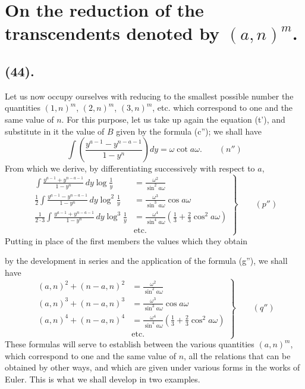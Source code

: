 \documentclass{article}
\begin{document}
\section*{On the reduction of the transcendents denoted by $(a,n)^{m}$.}

\subsection*{(44).}

Let us now occupy ourselves with reducing to the smallest possible number the quantities $(1,n)^{m}$, $(2,n)^{m}$, $(3,n)^{m}$, etc. which correspond to one and the same value of $n$. For this purpose, let us take up again the equation (t'), and substitute in it the value of $B$ given by the formula (c''); we shall have
\[ \int\left(\frac{y^{a-1}-y^{n-a-1}}{1-y^{n}}\right)dy=\omega\cot a\omega.\qquad(n'') \]
From which we derive, by differentiating successively with respect to $a$,
\[ \left.\begin{aligned} \int\frac{y^{a-1}+y^{n-a-1}}{1-y^{n}}\,dy\log\frac{1}{y}&=\frac{\omega^{2}}{\sin^{2}a\omega}\\ \frac{1}{2}\int\frac{y^{a-1}-y^{n-a-1}}{1-y^{n}}\,dy\log^{2}\frac{1}{y}&=\frac{\omega^{3}}{\sin^{3}a\omega}\cos a\omega\\ \frac{1}{2\cdot 3}\int\frac{y^{a-1}+y^{n-a-1}}{1-y^{n}}\,dy\log^{3}\frac{1}{y}&=\frac{\omega^{4}}{\sin^{4}a\omega}\left(\frac{1}{3}+\frac{2}{3}\cos^{2}a\omega\right)\\ &\text{etc.} \end{aligned}\right\}\qquad(p'') \]
Putting in place of the first members the values which they obtain

by the development in series and the application of the formula (g''), we shall have
\[ \left.\begin{aligned} (a,n)^{2}+(n-a,n)^{2}&=\frac{\omega^{2}}{\sin^{2}a\omega}\\ (a,n)^{3}+(n-a,n)^{3}&=\frac{\omega^{3}}{\sin^{3}a\omega}\cos a\omega\\ (a,n)^{4}+(n-a,n)^{4}&=\frac{\omega^{4}}{\sin^{4}a\omega}\left(\frac{1}{3}+\frac{2}{3}\cos^{2}a\omega\right)\\ &\text{etc.} \end{aligned}\right\}\qquad(q'') \]
These formulas will serve to establish between the various quantities $(a,n)^{m}$, which correspond to one and the same value of $n$, all the relations that can be obtained by other ways, and which are given under various forms in the works of Euler. This is what we shall develop in two examples.
\end{document}
